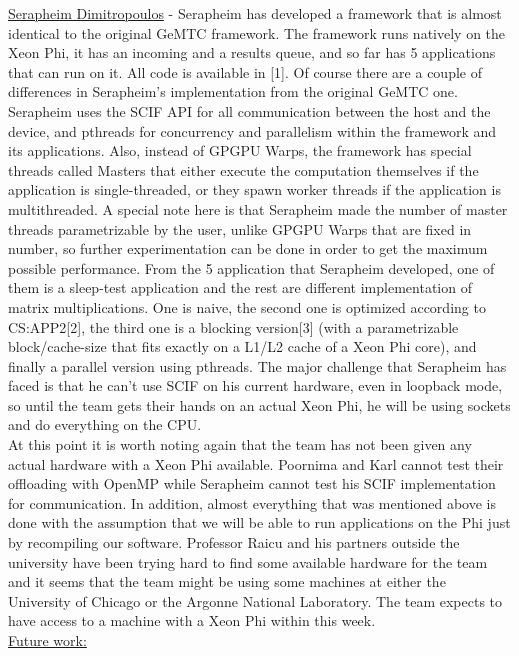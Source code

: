 \documentclass[10pt, conference, compsocconf]{IEEEtran}
\begin{document}
\underline{Serapheim Dimitropoulos} - Serapheim has developed a
framework that is almost identical to the original GeMTC framework.
The framework runs natively on the Xeon Phi, it has an incoming
and a results queue, and so far has 5 applications that can run
on it. All code is available in [1]. Of course there are a couple
of differences in Serapheim's implementation from the original
GeMTC one. Serapheim uses the SCIF API for all communication
between the host and the device, and pthreads for concurrency
and parallelism within the framework and its applications. Also,
instead of GPGPU Warps, the framework has special threads called
Masters that either execute the computation themselves if the
application is single-threaded, or they spawn worker threads
if the application is multithreaded. A special note here is
that Serapheim made the number of master threads parametrizable
by the user, unlike GPGPU Warps that are fixed in number, so
further experimentation can be done in order to get the maximum
possible performance. From the 5 application that Serapheim
developed, one of them is a sleep-test application and the
rest are different implementation of matrix multiplications.
One is naive, the second one is optimized according to CS:APP2[2],
the third one is a blocking version[3] (with a parametrizable
block/cache-size that fits exactly on a L1/L2 cache of a Xeon Phi core),
and finally a parallel version using pthreads. The major
challenge that Serapheim has faced is that he can't use SCIF
on his current hardware, even in loopback mode, so until
the team gets their hands on an actual Xeon Phi, he will
be using sockets and do everything on the CPU.\\

At this point it is worth noting again that the team has not been
given any actual hardware with a Xeon Phi available. Poornima
and Karl cannot test their offloading with OpenMP while Serapheim
cannot test his SCIF implementation for communication. In addition,
almost everything that was mentioned above is done with the assumption
that we will be able to run applications on the Phi just by recompiling
our software. Professor Raicu and his partners outside the university
have been trying hard to find some available hardware for the team
and it seems that the team might be using some machines at either
the University of Chicago or the Argonne National Laboratory.
The team expects to have access to a machine with a Xeon Phi within
this week.\\

\underline{Future work:}\\
\end{document}
